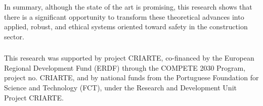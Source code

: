 \documentclass[runningheads]{llncs}
\newcommand{\criarteAcronym}{CRIARTE}
\begin{document}
In summary, although the state of the art is promising, this research shows that there is a significant opportunity to transform these theoretical advances into applied, robust, and ethical systems oriented toward safety in the construction sector.

\begin{credits}
\subsubsection{\ackname}
This research was supported by project \criarteAcronym, co-financed by the European Regional Development Fund (ERDF) through the COMPETE 2030 Program, project no. \criarteAcronym, and by national funds from the Portuguese Foundation for Science and Technology (FCT), under the Research and Development Unit Project \criarteAcronym.
\end{credits}

%


%
%
%
%
%
\begingroup


\endgroup

%
\end{document}
